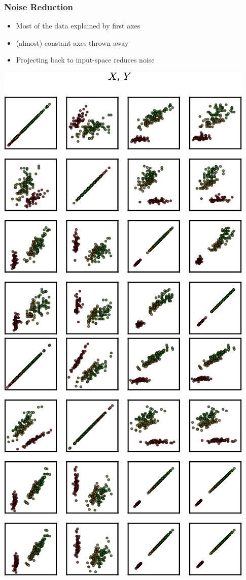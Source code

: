 \begin{frame}
  \frametitle{Noise Reduction}
  \begin{itemize}
  \item Most of the data explained by first axes
  \item (almost) constant axes thrown away
  \item Projecting back to input-space reduces noise
  \end{itemize}
  \begin{center}
    \includegraphics[width=.47\linewidth]{pca-pics/iris-all}\hfill%
    \includegraphics[width=.47\linewidth]{pca-pics/iris-bt}
  \end{center}
\end{frame}


